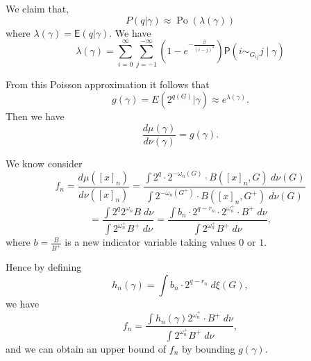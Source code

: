 \documentclass[11pt, a4paper, oneside]{article}
\theoremstyle{definition}
\theoremstyle{remark}
\begin{document}
We claim that,
$$
P(q|\gamma)\approx \operatorname{Po}(\lambda(\gamma))
$$
where $\lambda(\gamma) = \mathsf E(q|\gamma)$. We have 
\[
\lambda(\gamma) = \sum_{i=0}^{\infty} \sum_{j=-1}^{-\infty} (1-e^{-\frac{\beta}{(i-j)^2}}) 
\mathsf P(i\sim_{G_{ij}} j\mid \gamma)
\]

From this Poisson approximation it follows that 
$$
g(\gamma)=E(2^{q(G)}|\gamma) \approx e^{\lambda(\gamma)}.
$$
Then we have 
$$\frac{d\mu(\gamma)}{d\nu(\gamma)}=g(\gamma).$$

We know consider
$$f_n=\frac{d\mu([x]_n)}{d\nu([x]_n)}=\frac{\int 2^q \cdot 2^{-\omega_n(G)}\cdot B([x]_n,G)\ d\nu (G)}{\int 2^{-\omega_n(G^+)}\cdot B([x]_n, G^+)\; d\nu(G) }$$
$$=\frac{\int2^q 2^{\omega_n} B\; d\nu}{\int 2^{\omega_n^+} B^+\; d\nu }=\frac{\int b_n \cdot 2^{q-r_n}\cdot 2^{\omega_n^+}\cdot B^+\; d\nu}{\int 2^{\omega_n^+} B^+\; d\nu},$$
where $b=\frac{B}{B^+}$ is a new indicator variable taking values $0$ or $1$.

Hence by defining 
$$h_n(\gamma)=\int b_n \cdot 2^{q-r_n}\; d\xi(G),$$
we have
$$f_n=\frac{\int h_n(\gamma)2^{\omega_n^+}\cdot B^+\; d\nu}{\int 2^{\omega_n^+} B^+\; d\nu},$$
and we can obtain an upper bound of $f_n$ by bounding $g(\gamma)$.
\end{document}
